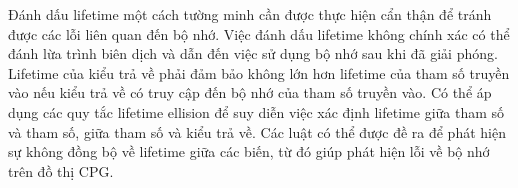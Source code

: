 Đánh dấu lifetime một cách tường minh cần được thực hiện cẩn thận để tránh được các lỗi liên quan đến bộ nhớ.
Việc đánh dấu lifetime không chính xác có thể đánh lừa trình biên dịch và dẫn đến việc sử dụng bộ nhớ sau khi đã giải phóng.
Lifetime của kiểu trả về phải đảm bảo không lớn hơn lifetime của tham số truyền vào nếu kiểu trả về có truy cập đến bộ nhớ của tham số truyền vào.
Có thể áp dụng các quy tắc lifetime ellision để suy diễn việc xác định lifetime giữa tham số và tham số, giữa tham số và kiểu trả về.
Các luật có thể được đề ra để phát hiện sự không đồng bộ về lifetime giữa các biến, từ đó giúp phát hiện lỗi về bộ nhớ trên đồ thị CPG.
